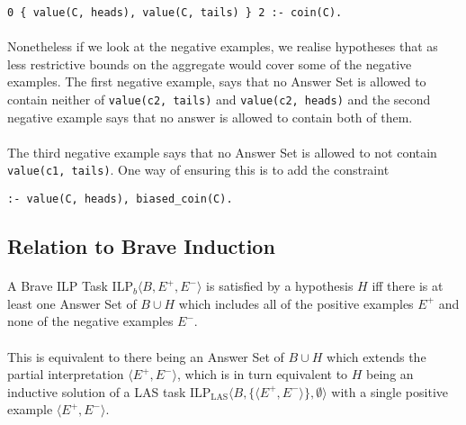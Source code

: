 \documentclass{article}
\theoremstyle{plain}
\theoremstyle{definition}
\begin{document}
\begin{multicols}{2}
\begin{lstlisting}
0 { value(C, heads), value(C, tails) } 2 :- coin(C).
\end{lstlisting}

\paragraph{} Nonetheless if we look at the negative examples, we realise hypotheses that as less restrictive bounds on the aggregate would cover some of the negative examples. The first negative example, says that no Answer Set is allowed to contain neither of \lstinline{value(c2, tails)} and \lstinline{value(c2, heads)} and the second negative example says that no answer is allowed to contain both of them. 

\paragraph{} The third negative example says that no Answer Set is allowed to not contain \lstinline{value(c1, tails)}. One way of ensuring this is to add the constraint

\begin{lstlisting}
:- value(C, heads), biased_coin(C).
\end{lstlisting}

\subsection{Relation to Brave Induction}

\paragraph{} A Brave ILP Task $\text{ILP}_b\langle B, E^+, E^-\rangle$ is satisfied by a hypothesis $H$ iff there is at least one Answer Set of $B \cup H$ which includes all of the positive examples $E^+$ and none of the negative examples $E^-$.

\paragraph{} This is equivalent to there being an Answer Set of $B \cup H$ which extends the partial interpretation $\langle E^+, E^-\rangle$, which is in turn equivalent to $H$ being an inductive solution of a LAS task $\text{ILP}_\text{LAS} \langle B, \{\langle E^+, E^- \rangle\}, \emptyset\rangle$ with a single positive example $\langle E^+, E^-\rangle$.


\end{multicols}
\end{document}
